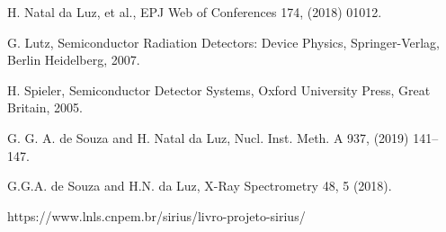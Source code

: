 \documentclass{report}
\begin{document}
\begin{thebibliography}{9}
 H. Natal da Luz, et al., EPJ Web of Conferences 174, (2018) 01012.

 G. Lutz, Semiconductor Radiation Detectors: Device Physics, Springer-Verlag, Berlin Heidelberg, 2007. 

 H. Spieler, Semiconductor Detector Systems, Oxford University Press, Great Britain, 2005.


 G. G. A. de Souza and  H. Natal da Luz, Nucl. Inst. Meth. A 937, (2019) 141–147.

 G.G.A. de Souza and H.N. da Luz, X-Ray Spectrometry 48, 5 (2018).

 https://www.lnls.cnpem.br/sirius/livro-projeto-sirius/



\end{thebibliography}
\end{document}
